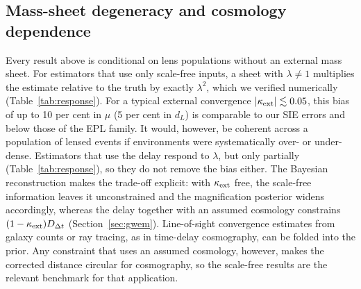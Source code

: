 \subsection{Mass-sheet degeneracy and cosmology dependence}
Every result above is conditional on lens populations without an external mass sheet. For estimators that use only scale-free inputs, a sheet with $\lambda\neq1$ multiplies the estimate relative to the truth by exactly $\lambda^2$, which we verified numerically (Table~\ref{tab:response}). For a typical external convergence $|\kappa_{\rm ext}|\lesssim0.05$, this bias of up to 10 per cent in $\mu$ (5 per cent in $d_L$) is comparable to our SIE errors and below those of the EPL family. It would, however, be coherent across a population of lensed events if environments were systematically over- or under-dense. Estimators that use the delay respond to $\lambda$, but only partially (Table~\ref{tab:response}), so they do not remove the bias either. The Bayesian reconstruction makes the trade-off explicit: with $\kappa_{\rm ext}$ free, the scale-free information leaves it unconstrained and the magnification posterior widens accordingly, whereas the delay together with an assumed cosmology constrains $(1-\kappa_{\rm ext})D_{\Delta t}$ (Section~\ref{sec:gwem}). Line-of-sight convergence estimates from galaxy counts or ray tracing, as in time-delay cosmography, can be folded into the prior. Any constraint that uses an assumed cosmology, however, makes the corrected distance circular for cosmography, so the scale-free results are the relevant benchmark for that application.

